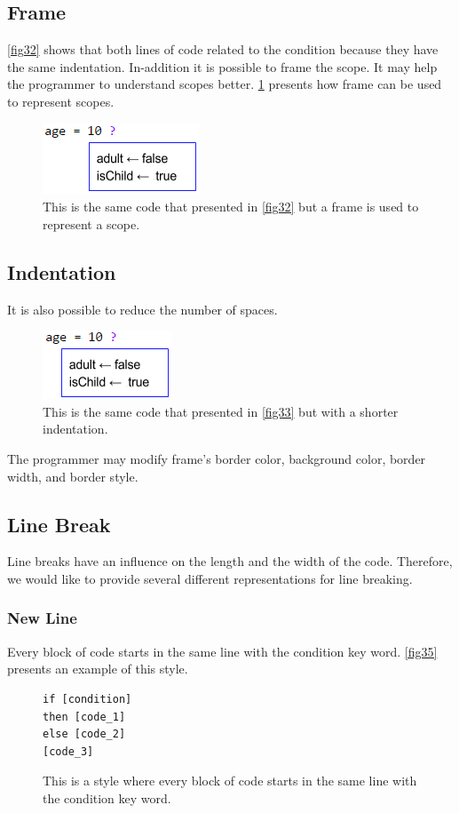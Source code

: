 \subsection{Frame}
\autoref{fig32} shows that both lines of code related to the condition because they have the same indentation. In-addition it is possible to frame the scope. It may help the programmer to understand scopes better. \ref{fig33} presents how frame can be used to represent scopes.
\begin{figure}[H]
\includegraphics{"./fig/Condition With Frame"}
\caption{This is the same code that presented in \autoref{fig32} but a frame is used to represent a scope.}
\label{fig33}
\end{figure}
\subsection{Indentation}
It is also possible to reduce the number of spaces.
\begin{figure}[H]
\includegraphics{"./fig/Condition With Frame and short Indentation"}
\caption{This is the same code that presented in \autoref{fig33} but with a shorter indentation.}
\label{fig34}
\end{figure}
The programmer may modify frame's border color, background color, border width, and border style.
\subsection{Line Break}
Line breaks have an influence on the length and the width of the code. Therefore, we would like to provide several different representations for line breaking.
\subsubsection{New Line}
Every block of code starts in the same line with the condition key word. \autoref{fig35} presents an example of this style.
\begin{figure}[H]
\begin{lstlisting}
if [condition]
then [code_1]
else [code_2]
[code_3]
\end{lstlisting}
\caption{This is a style where every block of code starts in the same line with the condition key word.}
\label{fig35}
\end{figure}
